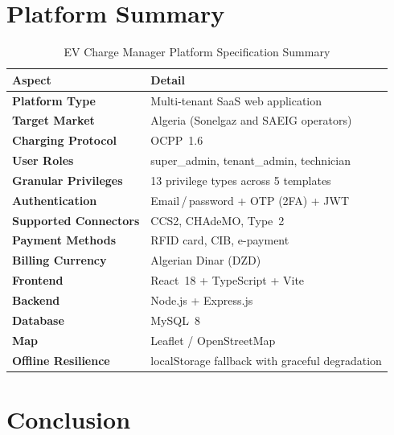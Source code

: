\documentclass[12pt,a4paper]{report}
\begin{document}
\section{Platform Summary}

\begin{table}[h!]
  \centering
  \caption{EV Charge Manager Platform Specification Summary}
  \label{tab:platform-summary}
  \renewcommand{\arraystretch}{1.3}
  \begin{tabular}{|>{\bfseries}p{4.5cm}|p{9cm}|}
    \hline
    Aspect                & Detail \\ \hline
    Platform Type         & Multi-tenant SaaS web application \\ \hline
    Target Market         & Algeria (Sonelgaz and SAEIG operators) \\ \hline
    Charging Protocol     & OCPP~1.6~\autocite{ocpp16_ed2} \\ \hline
    User Roles            & super\_admin, tenant\_admin, technician \\ \hline
    Granular Privileges   & 13 privilege types across 5 templates \\ \hline
    Authentication        & Email\,/\,password + OTP (2FA) + JWT~\autocite{rfc7519} \\ \hline
    Supported Connectors  & CCS2, CHAdeMO, Type~2 \\ \hline
    Payment Methods       & RFID card, CIB, e-payment \\ \hline
    Billing Currency      & Algerian Dinar (DZD) \\ \hline
    Frontend              & React~18 + TypeScript + Vite~\autocite{react_docs, vite_docs} \\ \hline
    Backend               & Node.js + Express.js~\autocite{nodejs_express} \\ \hline
    Database              & MySQL~8~\autocite{mysql_docs} \\ \hline
    Map                   & Leaflet / OpenStreetMap \\ \hline
    Offline Resilience    & localStorage fallback with graceful degradation \\ \hline
  \end{tabular}
\end{table}

\section{Conclusion}
\end{document}
